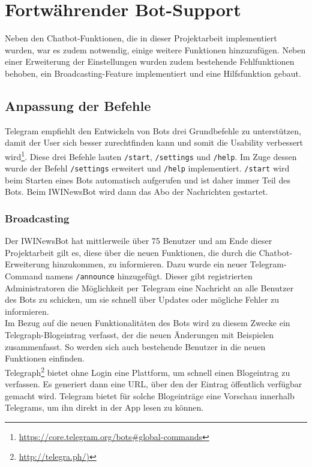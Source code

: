 \chapter{Fortwährender Bot-Support}
Neben den Chatbot-Funktionen, die in dieser Projektarbeit implementiert wurden, war es zudem notwendig, einige weitere Funktionen hinzuzufügen. Neben einer Erweiterung der Einstellungen wurden zudem bestehende Fehlfunktionen behoben, ein Broadcasting-Feature implementiert und eine Hilfsfunktion gebaut.

\section{Anpassung der Befehle}\label{sec:commands}
Telegram empfiehlt den Entwickeln von Bots drei Grundbefehle zu unterstützen, damit der User sich besser zurechtfinden kann und somit die Usability verbessert wird\footnote{\url{https://core.telegram.org/bots\#global-commands}}.
Diese drei Befehle lauten \texttt{/start}, \texttt{/settings} und \texttt{/help}. Im Zuge dessen wurde der Befehl \texttt{/settings} erweitert und \texttt{/help} implementiert. \texttt{/start} wird beim Starten eines Bots automatisch aufgerufen und ist daher immer Teil des Bots. Beim IWINewsBot wird dann das Abo der Nachrichten gestartet.

\subsection{Broadcasting}
Der IWINewsBot hat mittlerweile über 75 Benutzer und am Ende dieser Projektarbeit gilt es, diese über die neuen Funktionen, die durch die Chatbot-Erweiterung hinzukommen, zu informieren. Dazu wurde ein neuer Telegram-Command namens \texttt{/announce} hinzugefügt. Dieser gibt registrierten Administratoren die Möglichkeit per Telegram eine Nachricht an alle Benutzer des Bots zu schicken, um sie schnell über Updates oder mögliche Fehler zu informieren. \\
Im Bezug auf die neuen Funktionalitäten des Bots wird zu diesem Zwecke ein Telegraph-Blogeintrag verfasst, der die neuen Änderungen mit Beispielen zusammenfasst. So werden sich auch bestehende Benutzer in die neuen Funktionen einfinden. \\
Telegraph\footnote{\url{http://telegra.ph/)}} bietet ohne Login eine Plattform, um schnell einen Blogeintrag zu verfassen. Es generiert dann eine URL, über den der Eintrag öffentlich verfügbar gemacht wird. Telegram bietet für solche Blogeinträge eine Vorschau innerhalb Telegrams, um ihn direkt in der App lesen zu können.

